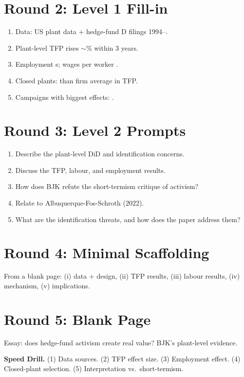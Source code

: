 \documentclass[11pt]{article}
\newcommand{\blank}[1]{\underline{\hspace{#1}}}
\begin{document}
\section*{Round 2: Level 1 Fill-in}
\begin{enumerate}
\item Data: US \blank{1cm} plant data + hedge-fund \blank{1cm}D filings 1994--\blank{1cm}.
\item Plant-level TFP rises $\sim$\blank{1cm}\% within 3 years.
\item Employment \blank{1cm}s; wages per worker \blank{1cm}.
\item Closed plants: \blank{1cm} than firm average in TFP.
\item Campaigns with biggest effects: \blank{1.5cm}.
\end{enumerate}

\section*{Round 3: Level 2 Prompts}
\begin{enumerate}
\item Describe the plant-level DiD and identification concerns.
\item Discuss the TFP, labour, and employment results.
\item How does BJK refute the short-termism critique of activism?
\item Relate to Albuquerque-Fos-Schroth (2022).
\item What are the identification threats, and how does the paper address them?
\end{enumerate}

\section*{Round 4: Minimal Scaffolding}
From a blank page: (i) data + design, (ii) TFP results, (iii) labour results, (iv) mechanism, (v) implications.

\section*{Round 5: Blank Page}
Essay: does hedge-fund activism create real value? BJK's plant-level evidence.

\vspace{6pt}
\begin{drillbox}
\textbf{Speed Drill.} (1) Data sources. (2) TFP effect size. (3) Employment effect. (4) Closed-plant selection. (5) Interpretation vs.\ short-termism.
\end{drillbox}
\end{document}
